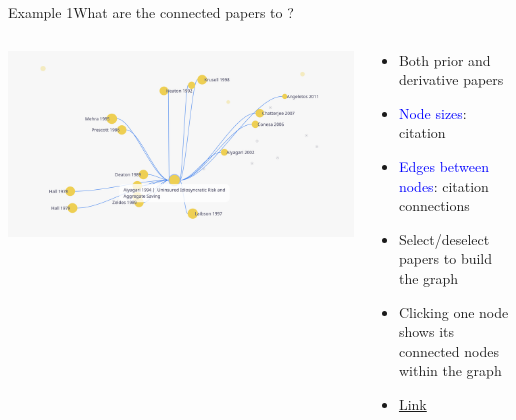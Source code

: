 \documentclass[aspectratio=43]{beamer}
\begin{document}
\begin{frame}{Example 1}{What are the connected papers to \cite{aiyagari1994uninsured}?}
    \begin{columns}[T]
    \vspace{0pt}
    \begin{column}{.60\textwidth}
        \includegraphics[width=\textwidth]{figures/Exam1.png}

        \vspace*{50mm} %
    \end{column}
    
    \hfill
    
    \begin{column}{.40\textwidth}
        \begin{itemize}
      
            \item Both prior and derivative papers
            \item \textcolor{blue}{Node sizes}: citation
            \item \textcolor{blue}{Edges between nodes}: citation connections
            \item Select/deselect papers to build the graph
            \item Clicking one node shows its connected nodes within the graph 
            \item \href{https://app.litmaps.co/shared/25D4C192-4BA5-4EB9-98C8-2659AB222055}{Link}
        \end{itemize}
    \end{column}
    \end{columns}
    

\end{frame}
\end{document}
